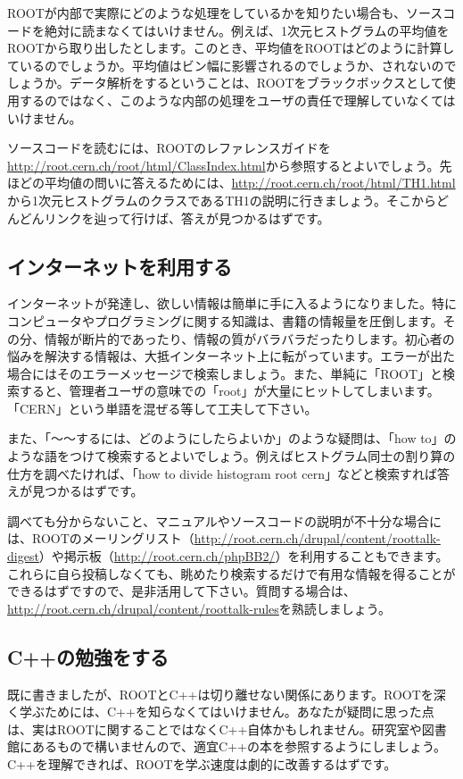 ROOTが内部で実際にどのような処理をしているかを知りたい場合も、ソースコードを絶対に読まなくてはいけません。例えば、1次元ヒストグラムの平均値をROOTから取り出したとします。このとき、平均値をROOTはどのように計算しているのでしょうか。平均値はビン幅に影響されるのでしょうか、されないのでしょうか。データ解析をするということは、ROOTをブラックボックスとして使用するのではなく、このような内部の処理をユーザの責任で理解していなくてはいけません。

ソースコードを読むには、ROOTのレファレンスガイドを\url{http://root.cern.ch/root/html/ClassIndex.html}から参照するとよいでしょう。先ほどの平均値の問いに答えるためには、\url{http://root.cern.ch/root/html/TH1.html}から1次元ヒストグラムのクラスであるTH1の説明に行きましょう。そこからどんどんリンクを辿って行けば、答えが見つかるはずです。

\subsection{インターネットを利用する}
インターネットが発達し、欲しい情報は簡単に手に入るようになりました。特にコンピュータやプログラミングに関する知識は、書籍の情報量を圧倒します。その分、情報が断片的であったり、情報の質がバラバラだったりします。初心者の悩みを解決する情報は、大抵インターネット上に転がっています。エラーが出た場合にはそのエラーメッセージで検索しましょう。また、単純に「ROOT」と検索すると、管理者ユーザの意味での「root」が大量にヒットしてしまいます。「CERN」という単語を混ぜる等して工夫して下さい。

また、「〜〜するには、どのようにしたらよいか」のような疑問は、「how to」のような語をつけて検索するとよいでしょう。例えばヒストグラム同士の割り算の仕方を調べたければ、「how to divide histogram root cern」などと検索すれば答えが見つかるはずです。

調べても分からないこと、マニュアルやソースコードの説明が不十分な場合には、ROOTのメーリングリスト（\url{http://root.cern.ch/drupal/content/roottalk-digest}）や掲示板（\url{http://root.cern.ch/phpBB2/}）を利用することもできます。これらに自ら投稿しなくても、眺めたり検索するだけで有用な情報を得ることができるはずですので、是非活用して下さい。質問する場合は、\url{http://root.cern.ch/drupal/content/roottalk-rules}を熟読しましょう。

\subsection{C++の勉強をする}
既に書きましたが、ROOTとC++は切り離せない関係にあります。ROOTを深く学ぶためには、C++を知らなくてはいけません。あなたが疑問に思った点は、実はROOTに関することではなくC++自体かもしれません。研究室や図書館にあるもので構いませんので、適宜C++の本を参照するようにしましょう。C++を理解できれば、ROOTを学ぶ速度は劇的に改善するはずです。
